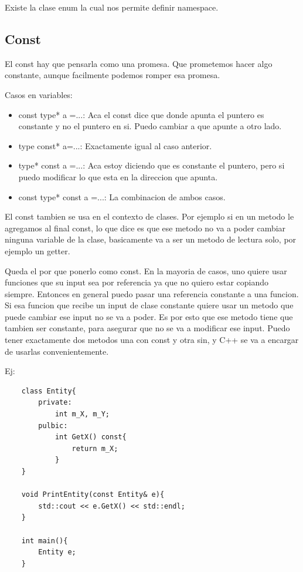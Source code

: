 \documentclass[11pt]{article}
\begin{document}
Existe la clase enum la cual nos permite definir namespace.
\subsection{Const}
El const hay que pensarla como una promesa.
Que prometemos hacer algo constante, aunque facilmente podemos romper esa promesa.

Casos en variables:
\begin{itemize}
    \item const type* a =...: Aca el const dice que donde apunta el puntero es constante
            y no el puntero en si. Puedo cambiar a que apunte a otro lado.
    \item type const* a=...: Exactamente igual al caso anterior.
    \item type* const a =...: Aca estoy diciendo que es constante el puntero, pero si
        puedo modificar lo que esta en la  direccion que apunta.
    \item const type* const a =...: La combinacion de ambos casos.
\end{itemize}

El const tambien se usa en el contexto de clases.
Por ejemplo si en un metodo le agregamos al final const, lo que dice es que ese
metodo no va a poder cambiar ninguna variable de la clase, basicamente va a ser
un metodo de lectura solo, por ejemplo un getter.

Queda el por que ponerlo como const.
En la mayoria de casos, uno quiere usar funciones que su input sea por referencia
ya que no quiero estar copiando siempre.
Entonces en general puedo pasar una referencia constante a una funcion.
Si esa funcion que recibe un input de clase constante quiere usar un metodo
que puede cambiar ese input no se va a poder.
Es por esto que ese metodo tiene que tambien ser constante, para asegurar
que no se va a modificar ese input.
Puedo tener exactamente dos metodos una con const y otra sin, y C++
se va a encargar de usarlas convenientemente.

Ej:
\begin{lstlisting}
    class Entity{
        private:
            int m_X, m_Y;
        pulbic:
            int GetX() const{
                return m_X;
            }
    }

    void PrintEntity(const Entity& e){
        std::cout << e.GetX() << std::endl;
    }

    int main(){
        Entity e;
    }
\end{lstlisting}
\end{document}
